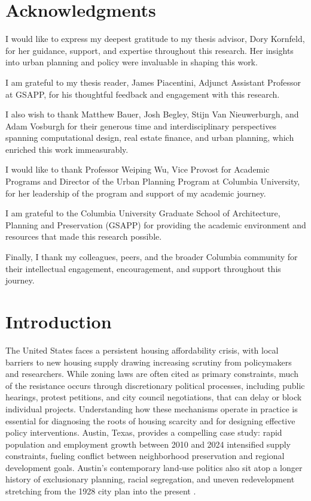 \documentclass[11pt, letterpaper, oneside]{article}
\begin{document}
{\newpage
\section*{Acknowledgments}
I would like to express my deepest gratitude to my thesis advisor, Dory Kornfeld, for her guidance, support, and expertise throughout this research. Her insights into urban planning and policy were invaluable in shaping this work.

I am grateful to my thesis reader, James Piacentini, Adjunct Assistant Professor at GSAPP, for his thoughtful feedback and engagement with this research.

I also wish to thank Matthew Bauer, Josh Begley, Stijn Van Nieuwerburgh, and Adam Vosburgh for their generous time and interdisciplinary perspectives spanning computational design, real estate finance, and urban planning, which enriched this work immeasurably.

I would like to thank Professor Weiping Wu, Vice Provost for Academic Programs and Director of the Urban Planning Program at Columbia University, for her leadership of the program and support of my academic journey.

I am grateful to the Columbia University Graduate School of Architecture, Planning and Preservation (GSAPP) for providing the academic environment and resources that made this research possible.

Finally, I thank my colleagues, peers, and the broader Columbia community for their intellectual engagement, encouragement, and support throughout this journey.

\newpage
\tableofcontents
\newpage
\listoffigures
\newpage
\listoftables

} %

\newpage
\cleardoublepage
\pagestyle{fancy} %
\doublespacing
\section{Introduction}

The United States faces a persistent housing affordability crisis, with local barriers to new housing supply drawing increasing scrutiny from policymakers and researchers. While zoning laws are often cited as primary constraints, much of the resistance occurs through discretionary political processes, including public hearings, protest petitions, and city council negotiations, that can delay or block individual projects. Understanding how these mechanisms operate in practice is essential for diagnosing the roots of housing scarcity and for designing effective policy interventions. Austin, Texas, provides a compelling case study: rapid population and employment growth between 2010 and 2024 intensified supply constraints, fueling conflict between neighborhood preservation and regional development goals. Austin's contemporary land-use politics also sit atop a longer history of exclusionary planning, racial segregation, and uneven redevelopment stretching from the 1928 city plan into the present \cite{cityaustin1928,way2018,whittemore2014racial,richardson2019dirty}.
\end{document}
